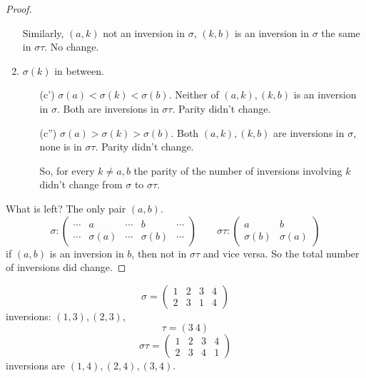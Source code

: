 \documentclass[10pt, a4paper]{article}
\begin{document}
\begin{lemma}
\begin{proof}
\begin{enumerate}[label = (\alph*)]
            Similarly,
            $(a, k)$ not an inversion in $\sigma$,
            $(k, b)$ is an inversion in $\sigma$ the same in $\sigma\tau$.
            No change.

            \item $\sigma(k)$ in between.
            \begin{enumerate}
                \item[(c')] $\sigma(a) < \sigma(k) < \sigma(b)$.
                Neither of $(a, k), (k, b)$ is an inversion in $\sigma$.
                Both are inversions in $\sigma\tau$.
                Parity didn't change.

                \item[(c'')] $\sigma(a) > \sigma(k) > \sigma(b)$.
                Both $(a, k), (k, b)$ are inversions in $\sigma$,
                none is in $\sigma\tau$.
                Parity didn't change.

                So,
                for every $k \neq a, b$ the parity of the number of inversions involving $k$ didn't change from $\sigma$ to $\sigma\tau$.
            \end{enumerate}
        \end{enumerate}

        What is left?
        The only pair $(a, b)$.
        \[
        \sigma:
        \begin{pmatrix}
            \dotsi & a & \dotsi & b & \dotsi \\
            \dotsi & \sigma(a) & \dotsi & \sigma(b) & \dotsi
        \end{pmatrix}\qquad 
        \sigma\tau:
        \begin{pmatrix}
            a & b \\
            \sigma(b) & \sigma(a)
        \end{pmatrix}
        \]
        if $(a, b)$ is an inversion in $b$,
        then not in $\sigma\tau$ and vice versa.
        So the total number of inversions did change.
    \end{proof}
\end{lemma}

\begin{example}
    \[
    \sigma = \begin{pmatrix}
        1 & 2 & 3 & 4 \\
        2 & 3 & 1 & 4
    \end{pmatrix}
    \]
    inversions:
    $(1, 3), (2, 3)$,
    \[
    \tau = (3\ 4)
    \]
    \[
    \sigma\tau = \begin{pmatrix}
        1 & 2 & 3 & 4 \\
        2 & 3 & 4 & 1
    \end{pmatrix}
    \]
    inversions are $(1, 4), (2, 4), (3, 4)$.
\end{example}
\end{document}
